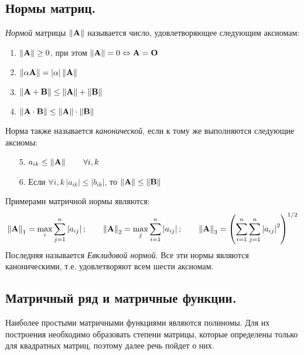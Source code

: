 \subsection{Нормы матриц.}
\begin{definition}
    \emph{Нормой} матрицы $\left\| \bf{A} \right\|$ называется число, удовлетворяющее следующим аксиомам:
    \begin{enumerate}
        \item $\displaystyle \left\| \bf{A} \right\| \geq 0$, при этом $\displaystyle \left\| \bf{A} \right\| = 0 \Leftrightarrow \bf{A} = \bf{O}$
        \item $\displaystyle \left\| \alpha \bf{A} \right\| = \left| \alpha \right| \left\| \bf{A} \right\|$
        \item $\left\| \bf{A} + \bf{B} \right\| \leq \left\| \bf{A} \right\| + \left\| \bf{B} \right\|$
        \item $\left\| \bf{A} \cdot \bf{B} \right\| \leq \left\| \bf{A} \right\| \cdot \left\| \bf{B} \right\|$
    \end{enumerate}
\end{definition}
Норма также называется \emph{канонической}, если к тому же выполняются следующие аксиомы:
\begin{enumerate}
    \item[5.] $a_{ik} \leq \left\| \bf{A} \right\| \qquad \forall i, k$
    \item[6.] Если $\forall i, k \, \left| a_{ik} \right| \leq \left| b_{ik} \right|$, то $\left\| \bf{A} \right\| \leq \left\| \bf{B} \right\|$
\end{enumerate}
Примерами матричной нормы являются:
\begin{equation*}
    \left\| \bf{A} \right\|_1 = \max_i \sum_{j=1}^{n} \left| a_{ij} \right|; \qquad \left\| \bf{A} \right\|_2 = \max_j \sum_{i=1}^{n} \left| a_{ij} \right|;
    \qquad \left\| \bf{A} \right\|_3 = \left( \sum_{i=1}^{n} \sum_{j=1}^{n} \left| a_{ij} \right|^2 \right)^{1/2}
\end{equation*}
Последняя называется \emph{Евклидовой нормой}. Все эти нормы являются каноническими, т.е. удовлетворяют всем шести
аксиомам.

\subsection{Матричный ряд и матричные функции.}
Наиболее простыми матричными функциями являются полиномы. Для их построения необходимо образовать степени матрицы,
которые определены только для квадратных матриц, поэтому далее речь пойдет о них.

